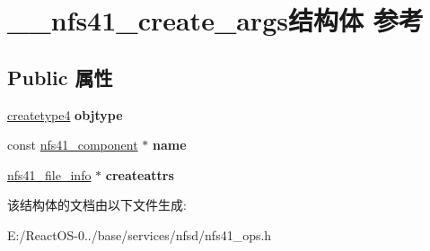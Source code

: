 \hypertarget{struct____nfs41__create__args}{}\section{\+\_\+\+\_\+nfs41\+\_\+create\+\_\+args结构体 参考}
\label{struct____nfs41__create__args}
\subsection*{Public 属性}
\begin{DoxyCompactItemize}
\item 
\mbox{\label{struct____nfs41__create__args_a1a5705dad08e673ff19c1399b70d8fd9}} 
\hyperlink{struct____createtype4}{createtype4} {\bfseries objtype}
\item 
\mbox{\label{struct____nfs41__create__args_a8571960b0ffb532c81f73d9d4f8c0826}} 
const \hyperlink{struct____nfs41__component}{nfs41\+\_\+component} $\ast$ {\bfseries name}
\item 
\mbox{\label{struct____nfs41__create__args_acb9e26fc787b1ead83be2b899e54058f}} 
\hyperlink{struct____nfs41__file__info}{nfs41\+\_\+file\+\_\+info} $\ast$ {\bfseries createattrs}
\end{DoxyCompactItemize}


该结构体的文档由以下文件生成\+:\begin{DoxyCompactItemize}
\item 
E\+:/\+React\+O\+S-\/0../base/services/nfsd/nfs41\+\_\+ops.\+h\end{DoxyCompactItemize}
